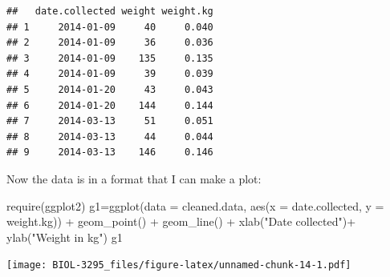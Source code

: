 \documentclass[
]{book}
\newenvironment{Shaded}{\begin{snugshade}}{\end{snugshade}}
\newcommand{\AttributeTok}[1]{\textcolor[rgb]{0.77,0.63,0.00}{#1}}
\newcommand{\FunctionTok}[1]{\textcolor[rgb]{0.00,0.00,0.00}{#1}}
\newcommand{\NormalTok}[1]{#1}
\newcommand{\OtherTok}[1]{\textcolor[rgb]{0.56,0.35,0.01}{#1}}
\newcommand{\SpecialCharTok}[1]{\textcolor[rgb]{0.00,0.00,0.00}{#1}}
\newcommand{\StringTok}[1]{\textcolor[rgb]{0.31,0.60,0.02}{#1}}
\begin{document}
\begin{verbatim}
##   date.collected weight weight.kg
## 1     2014-01-09     40     0.040
## 2     2014-01-09     36     0.036
## 3     2014-01-09    135     0.135
## 4     2014-01-09     39     0.039
## 5     2014-01-20     43     0.043
## 6     2014-01-20    144     0.144
## 7     2014-03-13     51     0.051
## 8     2014-03-13     44     0.044
## 9     2014-03-13    146     0.146
\end{verbatim}

Now the data is in a format that I can make a plot:

\begin{Shaded}
\begin{Highlighting}[]
\FunctionTok{require}\NormalTok{(ggplot2)}
\NormalTok{g1}\OtherTok{=}\FunctionTok{ggplot}\NormalTok{(}\AttributeTok{data =}\NormalTok{ cleaned.data, }\FunctionTok{aes}\NormalTok{(}\AttributeTok{x =}\NormalTok{ date.collected, }\AttributeTok{y =}\NormalTok{ weight.kg)) }\SpecialCharTok{+} 
  \FunctionTok{geom\_point}\NormalTok{() }\SpecialCharTok{+}
  \FunctionTok{geom\_line}\NormalTok{() }\SpecialCharTok{+}
  \FunctionTok{xlab}\NormalTok{(}\StringTok{"Date collected"}\NormalTok{)}\SpecialCharTok{+}
  \FunctionTok{ylab}\NormalTok{(}\StringTok{"Weight in kg"}\NormalTok{)}
\NormalTok{g1}
\end{Highlighting}
\end{Shaded}

\texttt{[image: BIOL-3295\_files/figure-latex/unnamed-chunk-14-1.pdf]}
\end{document}
